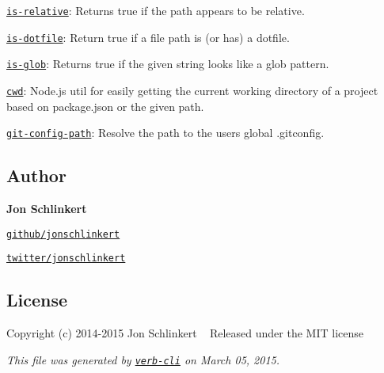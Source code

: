 \begin{DoxyItemize}
\item \href{https://github.com/jonschlinkert/is-relative}{\tt is-\/relative}\+: Returns {\ttfamily true} if the path appears to be relative.
\item \href{https://github.com/regexps/is-dotfile}{\tt is-\/dotfile}\+: Return true if a file path is (or has) a dotfile.
\item \href{https://github.com/jonschlinkert/is-glob}{\tt is-\/glob}\+: Returns {\ttfamily true} if the given string looks like a glob pattern.
\item \href{https://github.com/jonschlinkert/cwd}{\tt cwd}\+: Node.\+js util for easily getting the current working directory of a project based on package.\+json or the given path.
\item \href{https://github.com/jonschlinkert/git-config-path}{\tt git-\/config-\/path}\+: Resolve the path to the user\textquotesingle{}s global .gitconfig.
\end{DoxyItemize}

\subsection*{Author}

{\bfseries Jon Schlinkert}


\begin{DoxyItemize}
\item \href{https://github.com/jonschlinkert}{\tt github/jonschlinkert}
\item \href{http://twitter.com/jonschlinkert}{\tt twitter/jonschlinkert}
\end{DoxyItemize}

\subsection*{License}

Copyright (c) 2014-\/2015 Jon Schlinkert ~\newline
Released under the M\+IT license





{\itshape This file was generated by \href{https://github.com/assemble/verb-cli}{\tt verb-\/cli} on March 05, 2015.} 